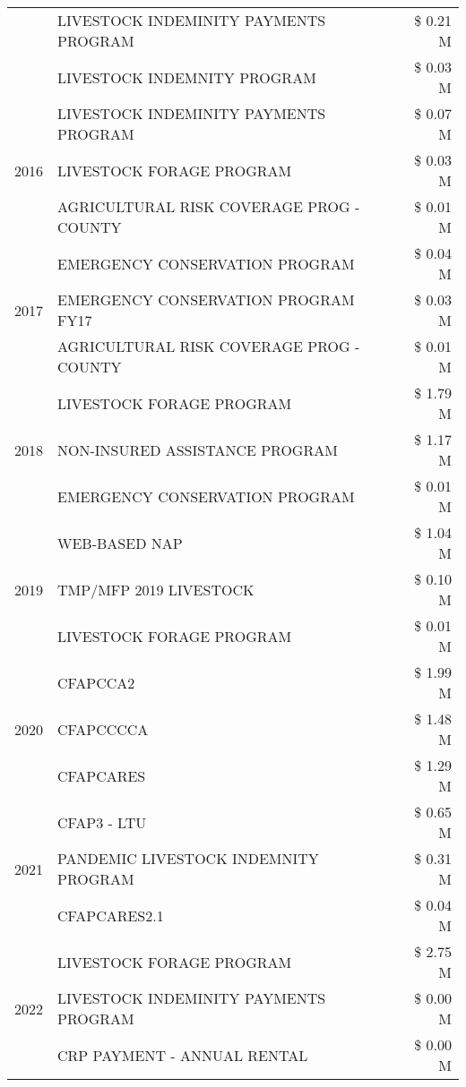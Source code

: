 \begin{tabular}{llr}
 & LIVESTOCK INDEMINITY PAYMENTS PROGRAM & \$ 0.21 M \\
 & LIVESTOCK INDEMNITY PROGRAM & \$ 0.03 M \\
\cline{1-3}
\multirow[t]{3}{*}{2016} & LIVESTOCK INDEMINITY PAYMENTS PROGRAM & \$ 0.07 M \\
 & LIVESTOCK FORAGE PROGRAM & \$ 0.03 M \\
 & AGRICULTURAL RISK COVERAGE PROG - COUNTY & \$ 0.01 M \\
\cline{1-3}
\multirow[t]{3}{*}{2017} & EMERGENCY CONSERVATION PROGRAM & \$ 0.04 M \\
 & EMERGENCY CONSERVATION PROGRAM FY17 & \$ 0.03 M \\
 & AGRICULTURAL RISK COVERAGE PROG - COUNTY & \$ 0.01 M \\
\cline{1-3}
\multirow[t]{3}{*}{2018} & LIVESTOCK FORAGE PROGRAM & \$ 1.79 M \\
 & NON-INSURED ASSISTANCE PROGRAM & \$ 1.17 M \\
 & EMERGENCY CONSERVATION PROGRAM & \$ 0.01 M \\
\cline{1-3}
\multirow[t]{3}{*}{2019} & WEB-BASED NAP & \$ 1.04 M \\
 & TMP/MFP 2019 LIVESTOCK & \$ 0.10 M \\
 & LIVESTOCK FORAGE PROGRAM & \$ 0.01 M \\
\cline{1-3}
\multirow[t]{3}{*}{2020} & CFAPCCA2 & \$ 1.99 M \\
 & CFAPCCCCA & \$ 1.48 M \\
 & CFAPCARES & \$ 1.29 M \\
\cline{1-3}
\multirow[t]{3}{*}{2021} & CFAP3 - LTU & \$ 0.65 M \\
 & PANDEMIC LIVESTOCK INDEMNITY PROGRAM & \$ 0.31 M \\
 & CFAPCARES2.1 & \$ 0.04 M \\
\cline{1-3}
\multirow[t]{3}{*}{2022} & LIVESTOCK FORAGE PROGRAM & \$ 2.75 M \\
 & LIVESTOCK INDEMINITY PAYMENTS PROGRAM & \$ 0.00 M \\
 & CRP PAYMENT - ANNUAL RENTAL & \$ 0.00 M \\
\cline{1-3}
\bottomrule
\end{tabular}
